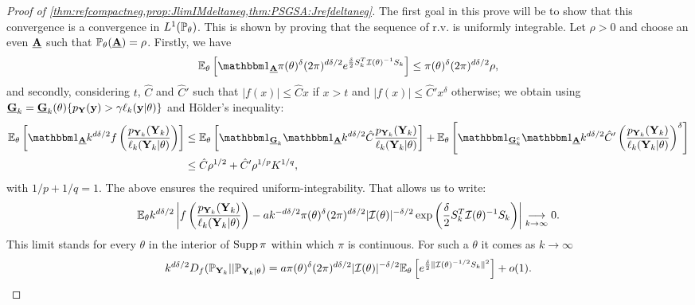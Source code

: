 \begin{proof}[Proof of \cref{thm:refcompactneg,prop:JlimIMdeltaneg,thm:PSGSA:Jrefdeltaneg}]
The first goal in this prove will be to show that this convergence  is a convergence in $L^1(\mathbb{P}_\theta)$. This is shown by proving that the sequence of r.v. is uniformly integrable. 
Let $\rho>0$ and choose an even $\underline{\mathbf{A}}$ such that $\mathbb{P}_\theta(\underline{\mathbf{A}})=\rho$. %
Firstly, we have 
    \begin{equation}
        \EE_\theta\left[\indic_{\ubf A} \pi(\theta)^\delta(2\pi)^{d\delta/2}e^{\frac{\delta}{2}S_k^T\cI(\theta)^{-1}S_k}\right]  
        \leq \pi(\theta)^\delta(2\pi)^{d\delta/2} \rho,
    \end{equation}
and secondly,
considering  $t$,  $\hat C$ and $\hat C'$ such that $|f(x)|\leq\hat Cx$ if $x>t$ and $|f(x)|\leq \hat C'x^\delta$ otherwise; we obtain using 
$\underline{\mathbf{G}}_k= \underline{\mathbf{G}}_k(\theta)\{p_{\mathbf{Y}}(\mathbf{y})>\gamma\ell_k(\mathbf{y}|\theta)\}$ and Hölder's inequality:
    \begin{align}
 \EE_\theta\left[ \indic_{\ubf A}k^{d\delta/2}f\left( \frac{p_{\mbf Y_k}(\mbf Y_k)}{\ell_k(\mbf Y_k|\theta)}\right) \right]
%    
\nonumber                  
    &\leq \EE_\theta\left[ \indic_{\ubf G_k}\indic_{\ubf A} k^{d\delta/2} \hat C  \frac{p_{\mbf Y_k}(\mbf Y_k)}{\ell_k(\mbf Y_k|\theta)} \right] + \EE_\theta\left[ \indic_{\ubf G_k^c}\indic_{\ubf A}k^{d\delta/2}\hat C'\left( \frac{p_{\mbf Y_k}(\mbf Y_k)}{\ell_k(\mbf Y_k|\theta)}\right)^\delta \right] \\
                & \leq \hat C\rho^{1/2}  + \hat C' \rho^{1/p} K^{1/q} , %
\end{align}
with $1/p+1/q=1$.
The above ensures the required uniform-integrability. %
That allows us to write:
    \begin{equation}
        \mathbb{E}_\theta k^{d\delta/2}\left|f\left(\frac{p_{\mathbf{Y}_k}(\mathbf{Y}_k)}{\ell_k(\mathbf{Y}_k|\theta)}\right)  - a k^{-d\delta/2}\pi(\theta)^\delta(2\pi)^{d\delta/2}|\mathcal{I}(\theta)|^{-\delta/2}\exp\left(\frac{\delta}{2} S_k^T\mathcal{I}(\theta)^{-1}S_k \right)  \right|
        \overset{\ }{\underset{k\rightarrow\infty}{\longrightarrow}}0.
    \end{equation}
This limit stands for every $\theta$ in the interior of $\operatorname{Supp}\pi$ within which $\pi$ is continuous. For such a $\theta$ it comes as $k\rightarrow\infty$
\begin{align}
    k^{d\delta/2} D_f(\PP_{\mbf Y_k} || \PP_{\mbf Y_k|\theta}) = a\pi(\theta)^\delta(2\pi)^{d\delta/2}|\cI(\theta)|^{-\delta/2}\EE_\theta\left[e^{\frac{\delta}{2} \|\cI(\theta)^{-1/2}S_k\|^2}\right] + o(1).  

\end{align}
\end{proof}
